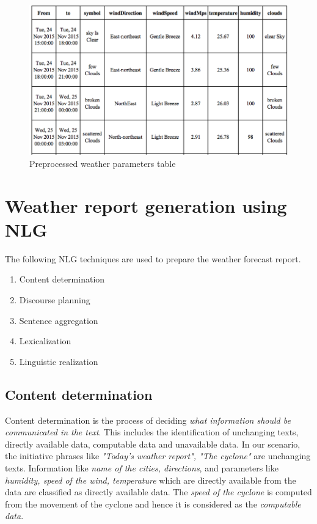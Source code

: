 \documentclass{article}
\begin{document}
\begin{figure}[h!tb]
\centering
\includegraphics[scale=0.35]{figures/processedText.png}
\caption{Preprocessed weather parameters table}
\label{fig:paramMatrix}
\end{figure}


\section{Weather report generation using NLG}
\label{sec:textReport}

The following NLG techniques are used to prepare the weather forecast report. 
\begin{enumerate}
\item Content determination
\item Discourse planning
\item Sentence aggregation
\item Lexicalization
\item Linguistic realization
\end{enumerate}

\subsection{Content determination}
\label{ssec:contentDetermination}

Content determination is the process of deciding {\it what information should be communicated in the text}. This includes the identification of unchanging texts, directly available data, computable data and unavailable data. In our scenario, the initiative phrases like {\it "Today's weather report", "The cyclone"} are unchanging texts. Information like {\it name of the cities, directions}, and parameters like {\it humidity, speed of the wind, temperature } which are directly available from the data are classified as directly available data. The {\it speed of the cyclone} is computed from the movement of the cyclone and hence it is considered as the {\it computable data}.
\end{document}
